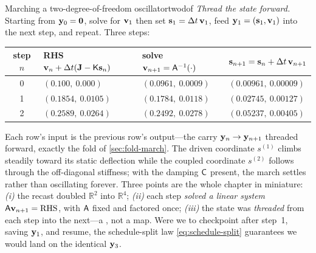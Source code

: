 \begin{workedexample}{Marching a two-degree-of-freedom oscillator}{twodof}
\medskip
\emph{Thread the state forward.} Starting from $\mathbf{y}_0 = \mathbf 0$, solve for
$\mathbf{v}_1$ then set $\mathbf{s}_1 = \Delta t\,\mathbf{v}_1$, feed $\mathbf{y}_1 = (\mathbf{s}_1, \mathbf{v}_1)$ into the
next step, and repeat. Three steps:
\begin{center}
\setlength{\tabcolsep}{7pt}
\renewcommand{\arraystretch}{1.2}
\begin{tabular}{@{}clll@{}}
\toprule
step $n$ & RHS $\mathbf{v}_n + \Delta t(\mathbf{J} - \mathsf{K}\mathbf{s}_n)$ & solve $\mathbf{v}_{n+1} = \mathsf{A}^{-1}(\cdot)$ & $\mathbf{s}_{n+1} = \mathbf{s}_n + \Delta t\,\mathbf{v}_{n+1}$ \\
\midrule
0 & $(0.100,\ 0.000)$ & $(0.0961,\ 0.0009)$ & $(0.00961,\ 0.00009)$ \\
1 & $(0.1854,\ 0.0105)$ & $(0.1784,\ 0.0118)$ & $(0.02745,\ 0.00127)$ \\
2 & $(0.2589,\ 0.0264)$ & $(0.2492,\ 0.0278)$ & $(0.05237,\ 0.00405)$ \\
\bottomrule
\end{tabular}
\end{center}
Each row's input is the previous row's output---the carry $\mathbf{y}_n \to \mathbf{y}_{n+1}$
threaded forward, exactly the fold of \cref{sec:fold-march}. The driven coordinate
$s^{(1)}$ climbs steadily toward its static deflection while the coupled coordinate
$s^{(2)}$ follows through the off-diagonal stiffness; with the damping $\mathsf{C}$
present, the march settles rather than oscillating forever. Three points are the
whole chapter in miniature: \emph{(i)} the recast doubled $\mathbb R^2$ into $\mathbb
R^4$; \emph{(ii)} each step \emph{solved a linear system} $\mathsf{A}\mathbf{v}_{n+1} =
\text{RHS}$, with $\mathsf{A}$ fixed and factored once; \emph{(iii)} the state was
\emph{threaded} from each step into the next---a , not a map. Were
we to checkpoint after step~1, saving $\mathbf{y}_1$, and resume, the schedule-split law
\cref{eq:schedule-split} guarantees we would land on the identical $\mathbf{y}_3$.
\end{workedexample}

